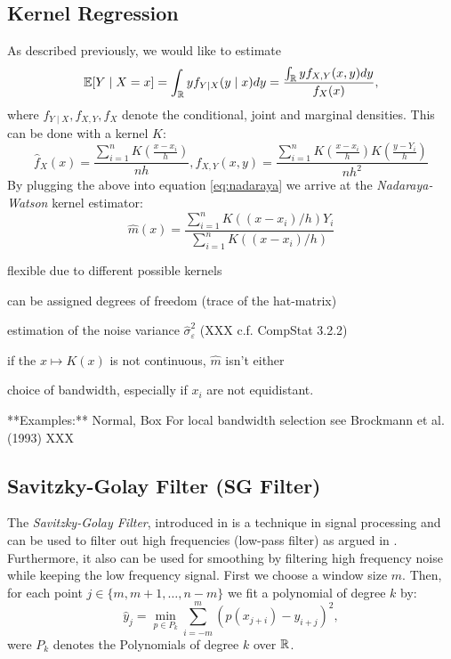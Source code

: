 \subsection{Kernel Regression}
\label{sec:Kernel}
As described previously, we would like to estimate
\begin{equation}
  \label{eq:nadaraya}
  \mathbb{E}[Y \mid X=x]
  = \int_{\mathbb{R}} y f_{Y \mid X}(y \mid x) d y
  =\frac{\int_{\mathbb{R}} y f_{X, Y}(x, y) d y}{f_{X}(x)},
\end{equation}
where $f_{Y \mid X}, f_{X, Y}, f_{X}$ denote the conditional, joint and marginal densities.
This can be done with a kernel $K$:
$$
  \hat{f}_{X}(x)=\frac{\sum_{i=1}^{n} K\left(\frac{x-x_{i}}{h}\right)}{n h}, \hat{f}_{X, Y}(x, y)=\frac{\sum_{i=1}^{n} K\left(\frac{x-x_{i}}{h}\right) K\left(\frac{y-Y_{i}}{h}\right)}{n h^{2}}
$$
By plugging the above into equation \ref{eq:nadaraya} we arrive at the \textit{Nadaraya-Watson} kernel estimator:
$$\hat{m}(x)=\frac{\sum_{i=1}^{n} K\left(\left(x-x_{i}\right) / h\right) Y_{i}}{\sum_{i=1}^{n} K\left(\left(x-x_{i}\right) / h\right)}$$


\begin{my_pros_cons_table}{
    \item flexible due to different possible kernels
    \item can be assigned degrees of freedom (trace of the hat-matrix)
    \item estimation of the noise variance $\hat \sigma_\varepsilon^2$ (XXX c.f. CompStat 3.2.2)
  }{
    \item if the $x \mapsto K(x)$ is not continuous, $\hat m $ isn't either
    \item choice of bandwidth, especially if $x_i$ are not equidistant.
  }
\end{my_pros_cons_table}


**Examples:**
Normal, Box
For local bandwidth selection see Brockmann et al. (1993) XXX



\subsection{Savitzky-Golay Filter (SG Filter)}
\label{sec:Savitzky–Golay}
The \textit{Savitzky-Golay Filter}, introduced in \cite{savitzkySmoothingDifferentiationData1964} is a technique in signal processing and can be used to filter out high frequencies (low-pass filter) as argued in \cite{schaferWhatSavitzkyGolayFilter2011}. Furthermore, it also can be used for smoothing by filtering high frequency noise while keeping the low frequency signal.
First we choose a window size $m$. Then, for each point $j \in \{m, m+1, \dots, n-m\}$ we fit a polynomial of degree $k$ by:
$$\hat y_j=\min_{p\in P_k}\sum_{i=-m}^{m}(p (x_{j+i})-y_{i+j})^{2},$$
were $P_k$ denotes the Polynomials of degree $k$ over $\mathbb{R}$.

